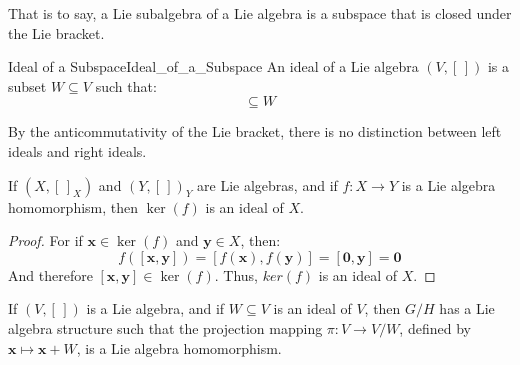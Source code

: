     That is to say, a Lie subalgebra of a Lie algebra is a subspace that is
    closed under the Lie bracket.
    \begin{fdefinition}{Ideal of a Subspace}{Ideal_of_a_Subspace}
        An ideal of a Lie algebra $(V,[\,])$ is a subset $W\subseteq{V}$
        such that:
        \begin{equation}
            [V,W]\subseteq{W}
        \end{equation}
    \end{fdefinition}
    By the anticommutativity of the Lie bracket, there is no distinction
    between left ideals and right ideals.
    \begin{theorem}
        If $(X,[\,]_{X})$ and $(Y,[\,])_{Y}$ are Lie algebras, and if
        $f:X\rightarrow{Y}$ is a Lie algebra homomorphism, then
        $\ker(f)$ is an ideal of $X$.
    \end{theorem}
    \begin{proof}
        For if $\mathbf{x}\in\ker(f)$ and $\mathbf{y}\in{X}$, then:
        \begin{equation}
            f([\mathbf{x},\mathbf{y}])
            =[f(\mathbf{x}),f(\mathbf{y})]
            =[\mathbf{0},\mathbf{y}]
            =\mathbf{0}
        \end{equation}
        And therefore $[\mathbf{x},\mathbf{y}]\in\ker(f)$. Thus,
        $ker(f)$ is an ideal of $X$.
    \end{proof}
    \begin{theorem}
        If $(V,[\,])$ is a Lie algebra, and if $W\subseteq{V}$ is an
        ideal of $V$, then $G/H$ has a Lie algebra structure such that the
        projection mapping $\pi:V\rightarrow{V}/W$, defined by
        $\mathbf{x}\mapsto\mathbf{x}+W$, is a Lie algebra homomorphism.
    \end{theorem}

